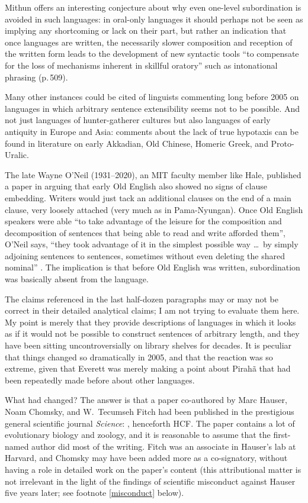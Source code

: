 \documentclass[output=paper,colorlinks,citecolor=brown
]{langscibook}
\begin{document}
Mithun offers an interesting conjecture about why even one-level
subordination is avoided in such languages: in oral-only languages
it should perhaps not be seen as implying any shortcoming or lack on
their part, but rather an indication that once languages are written,
the necessarily slower composition and reception of the written form
leads to the development of new syntactic tools ``to compensate for
the loss of mechanisms inherent in skillful oratory'' such as
intonational phrasing (p.\,509).

Many other instances could be cited of linguists commenting long before
2005 on languages in which arbitrary sentence extensibility seems not
to be possible. And not just languages of hunter-gatherer cultures
but also languages of early antiquity in Europe and Asia: comments
about the lack of true hypotaxis can be found in literature on
early Akkadian, Old Chinese, Homeric Greek, and Proto-Uralic.

The late Wayne O'Neil (1931--2020), an MIT faculty member like Hale,
published a paper in \citeyear{ONeil77} arguing that early Old English
also showed no signs of clause embedding. Writers would just tack an
additional clauses on the end of a main clause, very loosely attached
(very much as in Pama-Nyungan). Once Old English speakers were able
``to take advantage of the leisure for the composition and decomposition
of sentences that being able to read and write afforded them'', O'Neil
says, ``they took advantage of it in the simplest possible way \ldots\
by simply adjoining sentences to sentences, sometimes without even
deleting the shared nominal'' \citep[210]{ONeil77}. The implication
is that before Old English was written, subordination was basically
absent from the language.\label{page-non-infinite-languages-end}

The claims referenced in the last half-dozen paragraphs may or may not
be correct in their detailed analytical claims; I am not trying to
evaluate them here. My point is merely that they provide descriptions
of languages in which it looks as if it would not be possible to
construct sentences of arbitrary length, and they have been sitting
uncontroversially on library shelves for decades. It is peculiar that
things changed so dramatically in 2005, and that the reaction was so
extreme, given that Everett was merely making a point about Pirah{\~a}
that had been repeatedly made before about other languages.

What had changed? The answer is that a paper co-authored by Marc
Hauser, Noam Chomsky, and W.\ Tecumseh Fitch had been published in
the prestigious general scientific journal \textit{Science}: \citet{HauChoFit02}, henceforth HCF. The paper contains
a lot of evolutionary biology and zoology, and it is reasonable to
assume that the first-named author did most of the writing. Fitch was
an associate in Hauser's lab at Harvard, and Chomsky may have been
added more as a co-signatory, without having a role in detailed work
on the paper's content (this attributional matter is not irrelevant
in the light of the findings of scientific misconduct against Hauser
five years later; see footnote \ref{misconduct} below).
\end{document}
